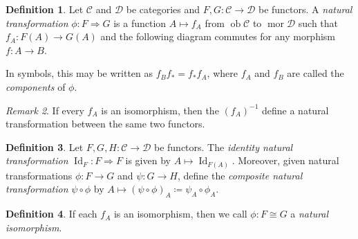 \documentclass[10pt,letterpaper,cm]{nupset}
\theoremstyle{definition}
\newtheorem{definition}{Definition}
\theoremstyle{theorem}
\theoremstyle{remark}
\newtheorem{remark}[definition]{Remark}
\newcommand{\1}{\mathbf{1}}
\renewcommand{\c}{\mathscr{C}}
\renewcommand{\d}{\mathscr{D}}
\newcommand{\0}{\vec 0}
\DeclareMathOperator{\id}{Id}
\DeclareMathOperator{\ob}{ob}
\DeclareMathOperator{\mor}{mor}
\begin{document}
\begin{abstract}
More basic category theory. The main sources for this talk are the following.
\begin{itemize}
\item \textit{nLab}.
\item John Rognes's \textit{Lecture Notes on Algebraic K-Theory}, Ch. 3.
\item Peter Johnstone's lecture notes for ``Category Theory" (Mathematical Tripos Part III, Michaelmas 2015), Ch. 1.
\end{itemize}
\end{abstract}

\begin{definition}
Let $\c$ and $\d$ be categories and $F,G: \c \to \d$ be functors.  A \textit{natural transformation} $\phi :F \Rightarrow G$  is a function $A \mapsto f_A$ from $\ob \c$ to $\mor \d$ such that $f_A : F(A) \to G(A)$ and the following diagram commutes for any morphism $f: A \to B$.

\begin{center}
\end{center}
In symbols, this may be written as $f_Bf_{\ast} = f_{\ast}f_A$, where $f_A$ and $f_B$ are called the \textit{components} of $\phi$.
\end{definition}

\begin{remark}\label{rmk}
If every $f_A$ is an isomorphism, then the $(f_A)^{-1}$ define a natural transformation between the same two functors.
\end{remark}

\begin{definition}
Let $F, G, H: \c \to \d$ be functors. The \textit{identity natural transformation} $\id_F : F \Rightarrow F$ is given by $A \mapsto \id_{F(A)}$. Moreover, given natural transformations $\phi: F \to G$ and $\psi: G \to H$, define the \textit{composite natural transformation} $\psi \circ \phi$ by $A \mapsto (\psi \circ \phi)_A \coloneqq \psi_{A} \circ \phi_{A}$.
\end{definition}


\begin{definition}
If each $f_A$ is an isomorphism, then we call $\phi: F \cong G$ a \textit{natural isomorphism}.
\end{definition}
\end{document}
